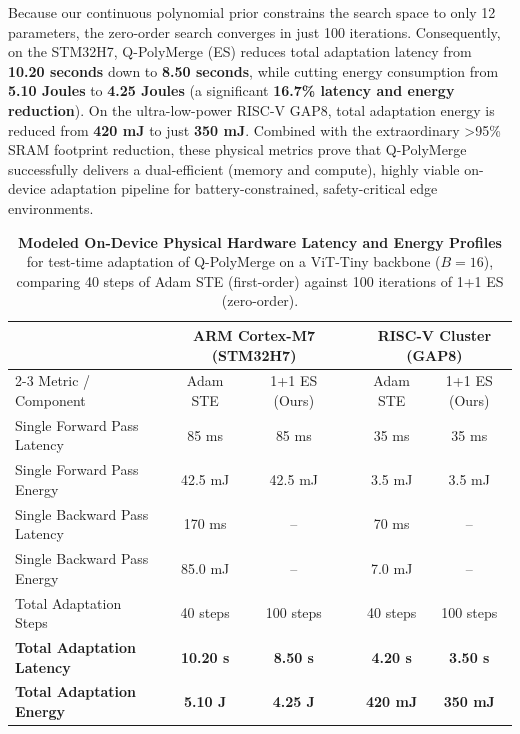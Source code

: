 Because our continuous polynomial prior constrains the search space to only 12 parameters, the zero-order search converges in just 100 iterations. Consequently, on the STM32H7, Q-PolyMerge (ES) reduces total adaptation latency from \textbf{10.20 seconds} down to \textbf{8.50 seconds}, while cutting energy consumption from \textbf{5.10 Joules} to \textbf{4.25 Joules} (a significant \textbf{16.7\% latency and energy reduction}). On the ultra-low-power RISC-V GAP8, total adaptation energy is reduced from \textbf{420 mJ} to just \textbf{350 mJ}. Combined with the extraordinary >95\% SRAM footprint reduction, these physical metrics prove that Q-PolyMerge successfully delivers a dual-efficient (memory and compute), highly viable on-device adaptation pipeline for battery-constrained, safety-critical edge environments.

\begin{table}[h]
\centering
\caption{\textbf{Modeled On-Device Physical Hardware Latency and Energy Profiles} for test-time adaptation of Q-PolyMerge on a ViT-Tiny backbone ($B=16$), comparing 40 steps of Adam STE (first-order) against 100 iterations of 1+1 ES (zero-order).}
\label{tab:hardware_metrics}
\vskip 0.15in
\begin{small}
\begin{sc}
\begin{tabular}{lccccc}
\toprule
 & \multicolumn{2}{c}{ARM Cortex-M7 (STM32H7)} & & \multicolumn{2}{c}{RISC-V Cluster (GAP8)} \\
\cmidrule{2-3} \cmidrule{5-6}
Metric / Component & Adam STE & 1+1 ES (Ours) & & Adam STE & 1+1 ES (Ours) \\
\midrule
Single Forward Pass Latency & 85 ms & 85 ms & & 35 ms & 35 ms \\
Single Forward Pass Energy & 42.5 mJ & 42.5 mJ & & 3.5 mJ & 3.5 mJ \\
Single Backward Pass Latency & 170 ms & -- & & 70 ms & -- \\
Single Backward Pass Energy & 85.0 mJ & -- & & 7.0 mJ & -- \\
\midrule
Total Adaptation Steps & 40 steps & 100 steps & & 40 steps & 100 steps \\
\textbf{Total Adaptation Latency} & \textbf{10.20 s} & \textbf{8.50 s} & & \textbf{4.20 s} & \textbf{3.50 s} \\
\textbf{Total Adaptation Energy} & \textbf{5.10 J} & \textbf{4.25 J} & & \textbf{420 mJ} & \textbf{350 mJ} \\
\bottomrule
\end{tabular}
\end{sc}
\end{small}
\end{table}

